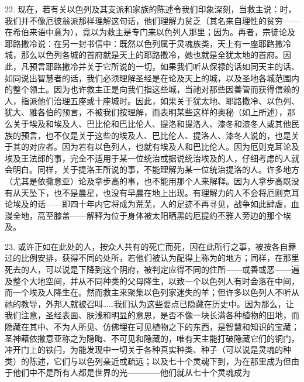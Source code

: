 22. 现在，若有关以色列及其支派和家族的陈述令我们印象深刻，当救主说：时，我们并不像厄彼翁派那样理解这句话，他们理解力贫乏（其名来自理性的贫穷——在希伯来语中意为），竟以为救主是专门来以色列人那里；因为。再者，宗徒论及耶路撒冷说：在另一封书信中：既然以色列属于灵魂族类，天上有一座耶路撒冷城，那么以色列各城的首府就是天上的耶路撒冷，她也就是全犹太地的首府。因此，凡预言耶路撒冷并关于它所说的一切，如果我们听从保禄的话如同天主的话、如同说出智慧者的话，我们必须理解圣经是在论及天上的城，以及圣地各城范围内的整个领土。因为也许救主正是向我们指这些城，当祂对那些因善管而获得信赖的人，指派他们治理五座或十座城时。因此，如果关于犹太地、耶路撒冷、以色列、犹大、雅各伯的预言，不被我们按理解，而表明某些这样的奥秘（如上所述），那么关于埃及和埃及人、巴比伦和巴比伦人、提洛和提洛人、漆冬和漆冬人或其他民族的预言，也不仅是关于这些的埃及人、巴比伦人、提洛人、漆冬人说的，也是关于其的对应者。因为若有以色列人，也就有埃及人和巴比伦人。因为厄则克耳论及埃及王法郎的事，完全不适用于某一位统治或据说统治埃及的人，仔细考虑的人就会明白。同样，关于提洛王所说的事，不能理解为某一位统治提洛的人。许多地方（尤其是依撒意亚）论及拿步高的事，也不能用那个人来解释。因为人拿步高既没有从天坠下，也不是晨星，也没有早晨在地上出现。有理解力的人不会将厄则克耳论埃及的话——即四十年内它将成为荒芜，人的足迹不再寻见，战争如此肆虐，血漫全地，高至膝盖——解释为位于身体被太阳晒黑的厄提约丕雅人旁边的那个埃及。\par

23. 或许正如在此处的人，按众人共有的死亡而死，因在此所行之事，被按各自罪过的比例安排，获得不同的处所，若他们被认为配得上称为的地方；同样，在那里死去的人，可以说是下降到这个阴府，被判定应得不同的住所——或善或恶——遍及整个大地空间，并从不同种类的父母降生，以致一个以色列人有时会落在中间，而一个埃及人降生在。然而救主来聚集以色列家迷失的羊；但许多以色列人不听从祂的教导，外邦人就被召叫……我们认为这些要点已隐藏在历史中。因为那么，让我们注意，圣经表面、肤浅和明显的意思，是否不像一块长满各种植物的田地，而隐藏在其中、不为人所见、仿佛埋在可见植物之下的东西，是智慧和知识的宝藏；圣神藉依撒意亚称之为隐晦、不可见和隐藏的，唯有天主能打破隐藏它们的铜门，冲开门上的铁闩，为能发现中一切关于各种真实种类、种子（可以说是灵魂的种类）的陈述，它们与以色列亲近或疏远；以及七十个灵魂下到，为在那里成为但由于他们中不是所有人都是世界的光————他们就从七十个灵魂成为\par

